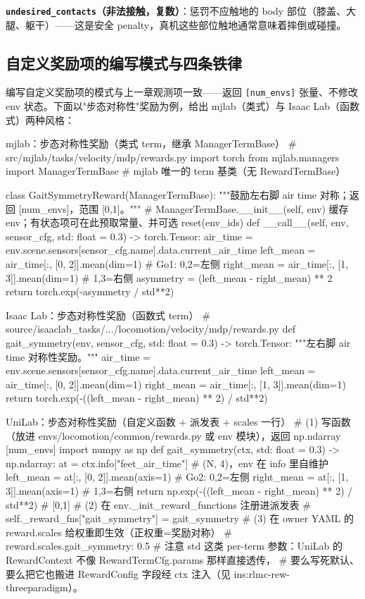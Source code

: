\textbf{\texttt{undesired\_contacts}（非法接触，复数）}：惩罚不应触地的 body 部位（膝盖、大腿、躯干）——这是安全 penalty，真机这些部位触地通常意味着摔倒或碰撞。

\subsection{自定义奖励项的编写模式与四条铁律}
\label{sec:rlmc-rew-custom}

编写自定义奖励项的模式与上一章观测项一致——返回 \verb|[num_envs]| 张量、不修改 env 状态。下面以"步态对称性"奖励为例，给出 mjlab（类式）与 Isaac Lab（函数式）两种风格：

\begin{codebox}[Python]{mjlab：步态对称性奖励（类式 term，继承 ManagerTermBase）}
# src/mjlab/tasks/velocity/mdp/rewards.py
import torch
from mjlab.managers import ManagerTermBase   # mjlab 唯一的 term 基类（无 RewardTermBase）

class GaitSymmetryReward(ManagerTermBase):
    """鼓励左右脚 air time 对称；返回 [num_envs]，范围 [0,1]。"""
    # ManagerTermBase.__init__(self, env) 缓存 env；有状态项可在此预取常量、并可选 reset(env_ids)
    def __call__(self, env, sensor_cfg, std: float = 0.3) -> torch.Tensor:
        air_time = env.scene.sensors[sensor_cfg.name].data.current_air_time
        left_mean  = air_time[:, [0, 2]].mean(dim=1)      # Go1: 0,2=左侧
        right_mean = air_time[:, [1, 3]].mean(dim=1)      # 1,3=右侧
        asymmetry = (left_mean - right_mean) ** 2
        return torch.exp(-asymmetry / std**2)
\end{codebox}

\begin{codebox}[Python]{Isaac Lab：步态对称性奖励（函数式 term）}
# source/isaaclab_tasks/.../locomotion/velocity/mdp/rewards.py
def gait_symmetry(env, sensor_cfg, std: float = 0.3) -> torch.Tensor:
    """左右脚 air time 对称性奖励。"""
    air_time = env.scene.sensors[sensor_cfg.name].data.current_air_time
    left_mean  = air_time[:, [0, 2]].mean(dim=1)
    right_mean = air_time[:, [1, 3]].mean(dim=1)
    return torch.exp(-((left_mean - right_mean) ** 2) / std**2)
\end{codebox}

\begin{codebox}[Python]{UniLab：步态对称性奖励（自定义函数 $+$ 派发表 $+$ scales 一行）}
# (1) 写函数（放进 envs/locomotion/common/rewards.py 或 env 模块），返回 np.ndarray [num_envs]
import numpy as np
def gait_symmetry(ctx, std: float = 0.3) -> np.ndarray:
    at = ctx.info["feet_air_time"]                  # (N, 4)，env 在 info 里自维护
    left_mean  = at[:, [0, 2]].mean(axis=1)         # Go2: 0,2=左侧
    right_mean = at[:, [1, 3]].mean(axis=1)         # 1,3=右侧
    return np.exp(-((left_mean - right_mean) ** 2) / std**2)   # [0,1]
# (2) 在 env._init_reward_functions 注册进派发表
#   self._reward_fns["gait_symmetry"] = gait_symmetry
# (3) 在 owner YAML 的 reward.scales 给权重即生效（正权重=奖励对称）
#   reward.scales.gait_symmetry: 0.5
# 注意 std 这类 per-term 参数：UniLab 的 RewardContext 不像 RewardTermCfg.params 那样直接透传，
#   要么写死默认、要么把它也搬进 RewardConfig 字段经 ctx 注入（见 ins:rlmc-rew-threeparadigm）。
\end{codebox}

